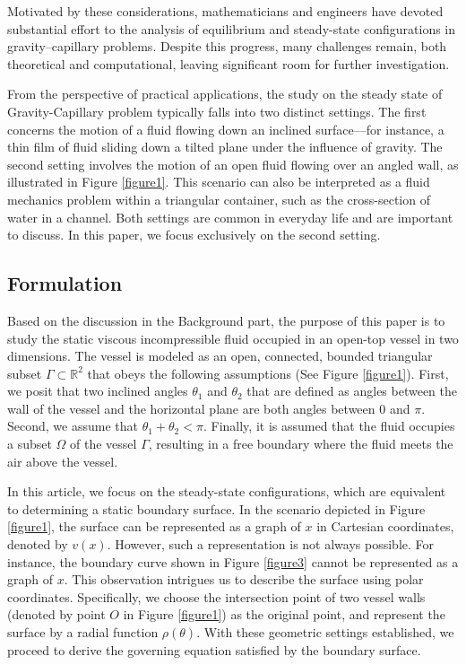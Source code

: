 \documentclass[letterpaper,reqno,10pt,twoside]{amsart}
\theoremstyle{definition}
\theoremstyle{remark}
\begin{document}
Motivated by these considerations, mathematicians and engineers have devoted substantial effort to the analysis of equilibrium and steady-state configurations in gravity–capillary problems. Despite this progress, many challenges remain, both theoretical and computational, leaving significant room for further investigation.

 From the perspective of practical applications, the study on the steady state of Gravity-Capillary problem typically falls into two distinct settings. The first concerns the motion of a fluid flowing down an inclined surface—for instance, a thin film of fluid sliding down a tilted plane under the influence of gravity. The second setting involves the motion of an open fluid flowing over an angled wall, as illustrated in Figure \ref{figure1}. This scenario can also be interpreted as a fluid mechanics problem within a triangular container, such as the cross-section of water in a channel. Both settings are common in everyday life and are important to discuss. In this paper, we focus exclusively on the second setting. 

 \subsection{Formulation} Based on the discussion in the Background part, the purpose of this paper is to study the static viscous incompressible fluid occupied in an open-top vessel in two dimensions. The vessel is modeled as an open, connected, bounded triangular subset $\Gamma\subset \mathbb{R}^{2}$ that obeys the following assumptions (See Figure \ref{figure1}). First, we posit that two inclined angles $\theta_1$ and $\theta_2$ that are defined as angles between the wall of the vessel and the horizontal plane are both angles between $0$ and $\pi$. Second, we assume that $\theta_1+\theta_2<\pi$. Finally, it is assumed that the fluid occupies a subset $\Omega$ of the vessel $\Gamma$, resulting in a free boundary where the fluid meets the air above the vessel.

In this article, we focus on the steady-state configurations, which are equivalent to determining a static boundary surface. In the scenario depicted in Figure \ref{figure1}, the surface can be represented as a graph of
$x$ in Cartesian coordinates, denoted by $v(x)$. However, such a representation is not always possible. For instance,  the boundary curve shown in Figure \ref{figure3} cannot be represented as a graph of $x$. This observation intrigues us to describe the surface using polar coordinates. Specifically, we choose the intersection point of two vessel walls (denoted by point $O$ in Figure \ref{figure1}) as the original point, and represent the surface by a radial function $\rho(\theta )$. With these geometric settings established, we proceed to derive the governing equation satisfied by the boundary surface.
\end{document}
